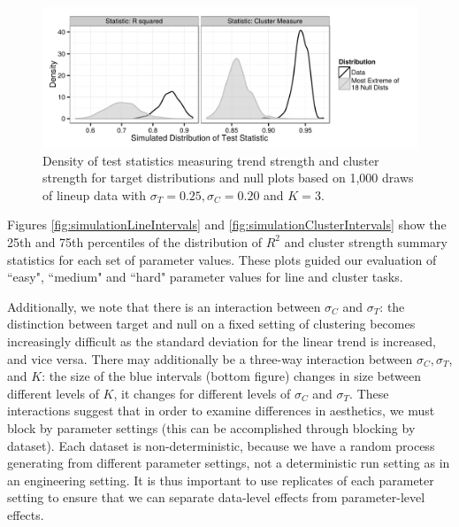 \documentclass[11pt]{isuthesis}\usepackage[]{graphicx}\usepackage[]{color}
\makeatletter
\def\maxwidth{ %
  \ifdim\Gin@nat@width>\linewidth
    \linewidth
  \else
    \Gin@nat@width
  \fi
}
\newenvironment{knitrout}{}{} %
\makeatother
\begin{document}
\begin{figure}[h]
\centering
\begin{knitrout}
\color{fgcolor}

{\centering \includegraphics[width=\maxwidth]{Figure/FeatureHierarchy/fig-null-distribution-1-1} 

}



\end{knitrout}
\caption[Simulation-based test statistic density for null and target plots]{\label{fig:targetsignal-0}Density of test statistics measuring trend strength and cluster strength for target distributions and null plots based on 1,000 draws of lineup data with $\sigma_T= 0.25, \sigma_C=0.20$ and $K=3$. }
\end{figure}

Figures \ref{fig:simulationLineIntervals} and \ref{fig:simulationClusterIntervals} show the 25th and 75th percentiles of the distribution of $R^2$ and cluster strength summary statistics for each set of parameter values. These plots guided our evaluation of ``easy", ``medium" and ``hard" parameter values for line and cluster tasks. 

Additionally, we note that there is an interaction between $\sigma_C$ and $\sigma_T$: the distinction between target and null on a fixed setting of clustering becomes increasingly difficult as the standard deviation for the linear trend is increased, and vice versa. There may additionally be a three-way interaction between $\sigma_C, \sigma_T$, and $K$: the size of the blue intervals (bottom figure) changes in size between different levels of $K$, it changes for different levels of $\sigma_C$ and $\sigma_T$. These interactions suggest that in order to examine differences in aesthetics, we must block by parameter settings (this can be accomplished through blocking by dataset). Each dataset is non-deterministic, because we have a random process generating from different parameter settings, not a deterministic run setting as in an engineering setting. It is thus important to use replicates of each parameter setting to ensure that we can separate data-level effects from parameter-level effects. 
\end{document}

